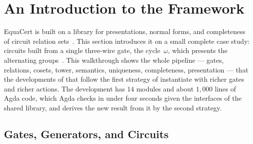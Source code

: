 \section{An Introduction to the Framework}\label{sec:case-study}

EquaCert is built on a library for presentations, normal forms, and completeness of circuit relation sets~\cite{bian2027popl}. This section introduces it on a small complete case study: circuits built from a single three-wire gate, the cycle~$\omega$, which presents the alternating groups~\cite[\S2.4]{lafont2003boolean}. This walkthrough shows the whole pipeline --- gates, relations, cosets, tower, semantics, uniqueness, completeness, presentation --- that the developments of  that follow the first strategy of  instantiate with richer gates and richer actions. The development has $14$ modules and about $1{,}000$ lines of Agda code, which Agda checks in under four seconds given the interfaces of the shared library, and  derives the new result from it by the second strategy.

\subsection{Gates, Generators, and Circuits}\label{sec:case-gates}


